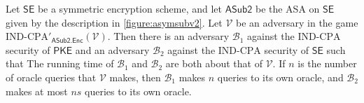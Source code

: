 \begin{theorem} \label{theorem:security}
Let $\mathsf{SE}$ be a symmetric encryption scheme, and let $\mathsf{ASub2}$ be the ASA on $\mathsf{SE}$ given by the description in \autoref{figure:asymsubv2}. Let $\mathcal{V}$ be an adversary in the game $\mathrm{IND}\text{-}\mathrm{CPA}'_{\mathsf{ASub2.Enc}}(\mathcal{V})$. Then there is an adversary $\mathcal{B}_1$ against the $\mathrm{IND}$-$\mathrm{CPA}$ security of $\mathsf{PKE}$ and an adversary $\mathcal{B}_2$ against the $\mathrm{IND}$-$\mathrm{CPA}$ security of $\mathsf{SE}$ such that
The running time of $\mathcal{B}_1$ and $\mathcal{B}_2$ are both about that of $\mathcal{V}$. If $n$ is the number of oracle queries that $\mathcal{V}$ makes, then $\mathcal{B}_1$ makes $n$ queries to its own oracle, and $\mathcal{B}_2$ makes at most $ns$ queries to its own oracle.
\end{theorem}
